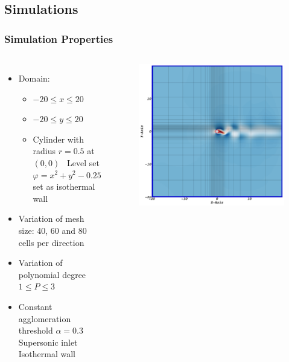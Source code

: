 	\subsection{Simulations}
		\begin{frame}
			\frametitle{Simulation Properties}
			\begin{columns}[t]
				\column[]{7cm}
				\vspace{-0.5cm}
			\begin{itemize}
				\item Domain:
				\begin{itemize}
					\item $-20 \leq x \leq 20$
					\item $-20 \leq y \leq 20$
					\item Cylinder with radius $r=0.5$ at $(0,0)$ \newline \MVRightarrow \, Level set $\varphi  = x^2 + y^2 -0.25$ set as  \color{myred} isothermal wall \color{black}
				\end{itemize}
				\pause
				\item Variation of mesh size: 40, 60 and 80 cells per direction
				\pause
				\item Variation of polynomial degree $1 \leq P \leq 3$
				\pause
				\item Constant agglomeration threshold $\alpha = 0.3$ \\[10pt]
				\onslide
				\bluedot Supersonic inlet
				\reddot Isothermal wall
			\end{itemize}
			\column[]{5.5cm}
			\onslide
			\vspace{-0.8cm}
			\begin{figure}[htbp]
				\includegraphics[width=\textwidth]{img/mesh40.PNG}

\end{figure}
\end{columns}
\end{frame}
